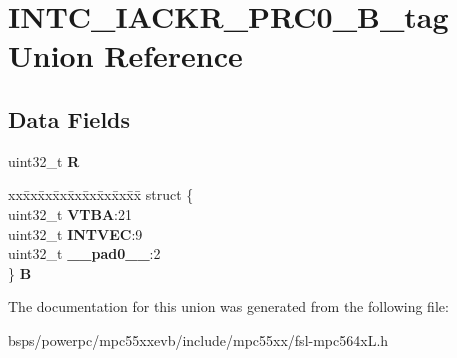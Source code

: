 \hypertarget{unionINTC__IACKR__PRC0__32B__tag}{}\section{I\+N\+T\+C\+\_\+\+I\+A\+C\+K\+R\+\_\+\+P\+R\+C0\+\_\+B\+\_\+tag Union Reference}
\label{unionINTC__IACKR__PRC0__32B__tag}
\subsection*{Data Fields}
\begin{DoxyCompactItemize}
\item 
\mbox{\label{unionINTC__IACKR__PRC0__32B__tag_a45c172c654dd2285f61960b692d67ec8}} 
uint32\+\_\+t {\bfseries R}
\item 
\mbox{\label{unionINTC__IACKR__PRC0__32B__tag_a5003e37ef8903549e2f07a387227b082}} 
\begin{tabbing}
xx\=xx\=xx\=xx\=xx\=xx\=xx\=xx\=xx\=\kill
struct \{\\
\>uint32\_t {\bfseries VTBA}:21\\
\>uint32\_t {\bfseries INTVEC}:9\\
\>uint32\_t {\bfseries \_\_pad0\_\_}:2\\
\} {\bfseries B}\\

\end{tabbing}\end{DoxyCompactItemize}


The documentation for this union was generated from the following file\+:\begin{DoxyCompactItemize}
\item 
bsps/powerpc/mpc55xxevb/include/mpc55xx/fsl-\/mpc564x\+L.\+h\end{DoxyCompactItemize}
